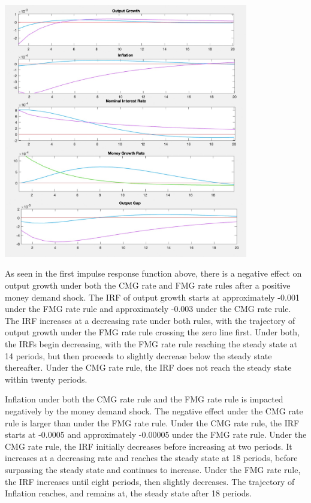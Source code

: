 \documentclass[11pt,preprint, authoryear]{elsarticle}
\let\origfigure\figure
\let\endorigfigure\endfigure
\renewenvironment{figure}[1][2] {
    \expandafter\origfigure\expandafter[H]
} {
    \endorigfigure
}
\numberwithin{equation}{section}
\numberwithin{figure}{section}
\numberwithin{table}{section}
\begin{document}
\begin{figure}
\centering
\includegraphics[width=0.8\textwidth,height=0.6\textheight]{./figures/money-demand-shock.jpeg}
\caption{Plots of Impulse Response Functions for a Money Demand Shock}
\end{figure}

As seen in the first impulse response function above, there is a
negative effect on output growth under both the CMG rate and FMG rate
rules after a positive money demand shock. The IRF of output growth
starts at approximately -0.001 under the FMG rate rule and approximately
-0.003 under the CMG rate rule. The IRF increases at a decreasing rate
under both rules, with the trajectory of output growth under the FMG
rate rule crossing the zero line first. Under both, the IRFs begin
decreasing, with the FMG rate rule reaching the steady state at 14
periods, but then proceeds to slightly decrease below the steady state
thereafter. Under the CMG rate rule, the IRF does not reach the steady
state within twenty periods.

Inflation under both the CMG rate rule and the FMG rate rule is impacted
negatively by the money demand shock. The negative effect under the CMG
rate rule is larger than under the FMG rate rule. Under the CMG rate
rule, the IRF starts at -0.0005 and approximately -0.00005 under the FMG
rate rule. Under the CMG rate rule, the IRF initially decreases before
increasing at two periods. It increases at a decreasing rate and reaches
the steady state at 18 periods, before surpassing the steady state and
continues to increase. Under the FMG rate rule, the IRF increases until
eight periods, then slightly decreases. The trajectory of Inflation
reaches, and remains at, the steady state after 18 periods.
\end{document}
